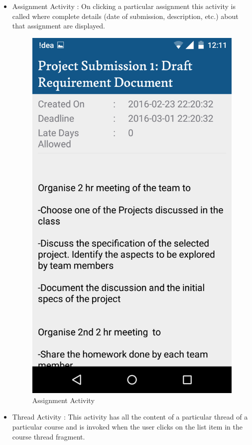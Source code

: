 \documentclass{article}
\begin{document}
\begin{itemize}
\item Assignment Activity : On clicking a particular assignment this activity is called where complete details (date of submission, description, etc.) about that assignment are displayed.\\
\begin{figure}[!h]
\centering
	\includegraphics[width=0.35\linewidth]{pic9}
	\caption*{Assignment Activity} 
\end{figure}
\item Thread Activity : This activity has all the content of a particular thread of a particular course and is invoked when the user clicks on the list item in the course thread fragment.\\
\begin{figure}[!h]
\centering
\begin{subfigure}{.4\textwidth}
  \centering

\end{subfigure}
\end{figure}
\end{itemize}
\end{document}
